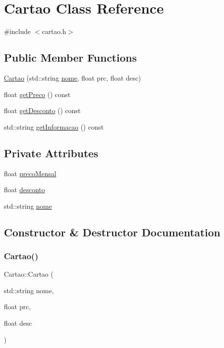 \hypertarget{class_cartao}{}\section{Cartao Class Reference}
\label{class_cartao}


{\ttfamily \#include $<$cartao.\+h$>$}

\subsection*{Public Member Functions}
\begin{DoxyCompactItemize}
\item 
\mbox{\hyperlink{class_cartao_ae968e48767011c4daddbb85952c4c5db}{Cartao}} (std\+::string \mbox{\hyperlink{class_cartao_a831b64c396e3903ff85c8165640eb41a}{nome}}, float prc, float desc)
\item 
float \mbox{\hyperlink{class_cartao_a3b2aebc6843c561c862f2efe7ff02115}{get\+Preco}} () const
\item 
float \mbox{\hyperlink{class_cartao_a853d214e1f98f1f49c364b75942ab1c4}{get\+Desconto}} () const
\item 
std\+::string \mbox{\hyperlink{class_cartao_a53a61ff5e28d5c7020fd84268dcddfb6}{get\+Informacao}} () const
\end{DoxyCompactItemize}
\subsection*{Private Attributes}
\begin{DoxyCompactItemize}
\item 
float \mbox{\hyperlink{class_cartao_adfaee23e98127abf18d04e93aa453f57}{preco\+Mensal}}
\item 
float \mbox{\hyperlink{class_cartao_a9abef37fa118bed1459d3c273c79a76a}{desconto}}
\item 
std\+::string \mbox{\hyperlink{class_cartao_a831b64c396e3903ff85c8165640eb41a}{nome}}
\end{DoxyCompactItemize}


\subsection{Constructor \& Destructor Documentation}
\mbox{\label{class_cartao_ae968e48767011c4daddbb85952c4c5db}} 
\subsubsection{\texorpdfstring{Cartao()}{Cartao()}}
{\footnotesize\ttfamily Cartao\+::\+Cartao (\begin{DoxyParamCaption}\item[{std\+::string}]{nome,  }\item[{float}]{prc,  }\item[{float}]{desc }\end{DoxyParamCaption})}

